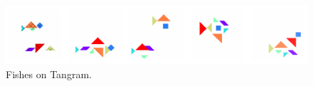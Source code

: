 \begin{figure}[H]
    \centering
    \includegraphics[width=\textwidth]{images/curation_fish.pdf}
    \caption{Fishes on Tangram.}
    \label{fig:curation_fish}
\end{figure}

